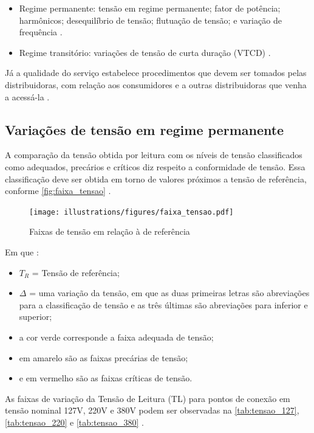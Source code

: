 \begin{itemize}
  \item Regime permanente: tensão em regime permanente; fator de potência; harmônicos; desequilíbrio de tensão; flutuação de tensão; e variação de frequência \cite{ref:ANEEL2021}.
  \item Regime transitório: variações de tensão de curta duração (VTCD) \cite{ref:ANEEL2021}.
\end{itemize}

Já a qualidade do serviço estabelece procedimentos que devem ser tomados pelas distribuidoras, com relação aos consumidores e a outras distribuidoras que venha a acessá-la \cite{ref:ANEEL2021}.

\subsection{Variações de tensão em regime permanente}

A comparação da tensão obtida por leitura com os níveis de tensão classificados como adequados, precários e críticos diz respeito a conformidade de tensão. Essa classificação deve ser obtida em torno de valores próximos a tensão de referência, conforme \autoref{fig:faixa_tensao} \cite{ref:ANEEL2021}.

\begin{figure}[H]
	\centering
	\caption{Faixas de tensão em relação à de referência}
	\label{fig:faixa_tensao}
	\texttt{[image: illustrations/figures/faixa\_tensao.pdf]}
\end{figure}

Em que \cite{ref:ANEEL2021}:

\begin{itemize}
  \item $T_R$ = Tensão de referência;
  \item $\Delta$ = uma variação da tensão, em que as duas primeiras letras são abreviações para a classificação de tensão e as três últimas são abreviações para inferior e superior;
  \item a cor verde corresponde a faixa adequada de tensão;
  \item em amarelo são as faixas precárias de tensão;
  \item e em vermelho são as faixas críticas de tensão.
\end{itemize}


As faixas de variação da Tensão de Leitura (TL) para pontos de conexão em tensão nominal 127V, 220V e 380V podem ser observadas na \autoref{tab:tensao_127}, \autoref{tab:tensao_220} e \autoref{tab:tensao_380} \cite{ref:ANEEL2021}.

